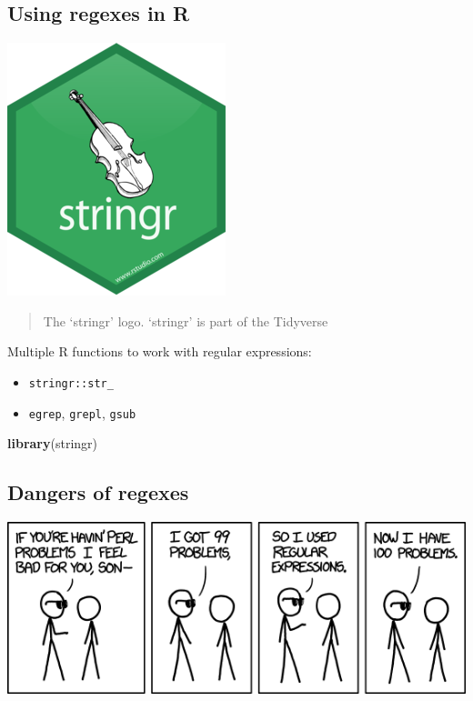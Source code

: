 \documentclass[]{book}
\newenvironment{Shaded}{}{}
\newcommand{\KeywordTok}[1]{\textcolor[rgb]{0.00,0.44,0.13}{\textbf{#1}}}
\newcommand{\NormalTok}[1]{#1}
\providecommand{\tightlist}{%
  \setlength{\itemsep}{0pt}\setlength{\parskip}{0pt}}
\begin{document}
\hypertarget{using-regexes-in-r}{%
\subsection{Using regexes in R}\label{using-regexes-in-r}}

\includegraphics{data/06_stringr.png}

\begin{quote}
The `stringr' logo. `stringr' is part of the Tidyverse
\end{quote}

Multiple R functions to work with regular expressions:

\begin{itemize}
\tightlist
\item
  \texttt{stringr::str\_}
\item
  \texttt{egrep}, \texttt{grepl}, \texttt{gsub}
\end{itemize}

\begin{Shaded}
\begin{Highlighting}[]
\KeywordTok{library}\NormalTok{(stringr)}
\end{Highlighting}
\end{Shaded}

\hypertarget{dangers-of-regexes}{%
\subsection{Dangers of regexes}\label{dangers-of-regexes}}

\includegraphics{data/06_perl_problems.png}
\end{document}
